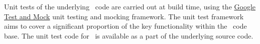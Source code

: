 Unit tests of the underlying \CNAME\ code are carried out at build time, using the \href{https://github.com/google/googletest}{Google Test and Mock} unit testing and mocking framework. The unit test framework aims to cover a significant proportion of the key functionality within the \CNAME\ code base. The unit test code for \CNAME\ is available as a part of the underlying source code.


